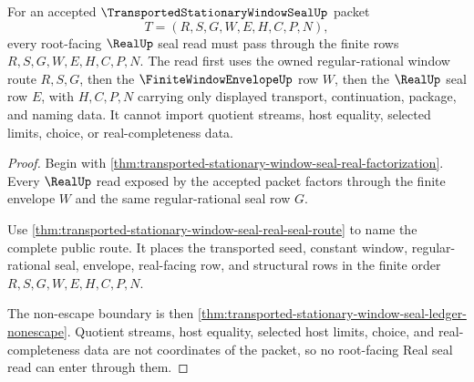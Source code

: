 \begin{theorem}
\label{thm:transported-stationary-window-seal-root-real-seal-nonescape}
For an accepted $\TransportedStationaryWindowSealUp$ packet
$$
T=(R,S,G,W,E,H,C,P,N),
$$
every root-facing $\RealUp$ seal read must pass through the finite rows $R,S,G,W,E,H,C,P,N$. The read first uses the owned regular-rational window route $R,S,G$, then the $\FiniteWindowEnvelopeUp$ row $W$, then the $\RealUp$ seal row $E$, with $H,C,P,N$ carrying only displayed transport, continuation, package, and naming data. It cannot import quotient streams, host equality, selected limits, choice, or real-completeness data.
\end{theorem}
\begin{proof}
Begin with \autoref{thm:transported-stationary-window-seal-real-factorization}. Every $\RealUp$ read exposed by the accepted packet factors through the finite envelope $W$ and the same regular-rational seal row $G$.

Use \autoref{thm:transported-stationary-window-seal-real-seal-route} to name the complete public route. It places the transported seed, constant window, regular-rational seal, envelope, real-facing row, and structural rows in the finite order $R,S,G,W,E,H,C,P,N$.

The non-escape boundary is then \autoref{thm:transported-stationary-window-seal-ledger-nonescape}. Quotient streams, host equality, selected host limits, choice, and real-completeness data are not coordinates of the packet, so no root-facing Real seal read can enter through them.
\end{proof}

